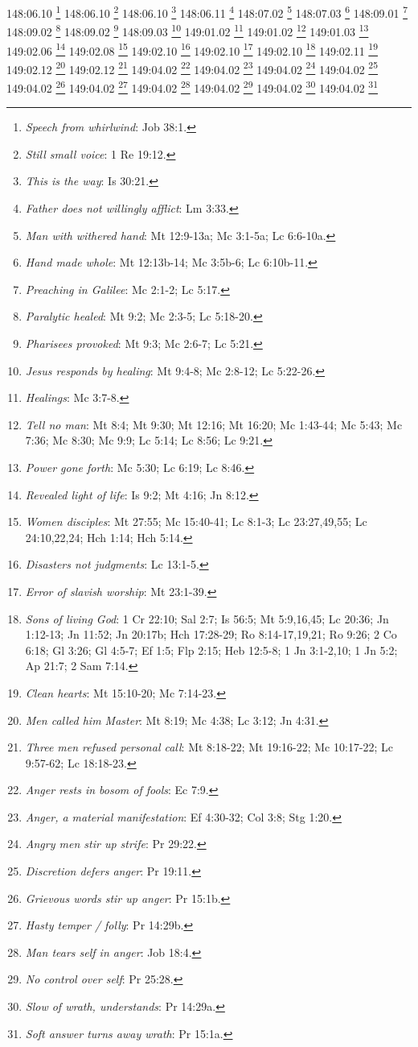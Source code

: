 148:06.10 \footnote{\textit{Speech from whirlwind}: Job 38:1.}
148:06.10 \footnote{\textit{Still small voice}: 1 Re 19:12.}
148:06.10 \footnote{\textit{This is the way}: Is 30:21.}
148:06.11 \footnote{\textit{Father does not willingly afflict}: Lm 3:33.}
148:07.02 \footnote{\textit{Man with withered hand}: Mt 12:9-13a; Mc 3:1-5a; Lc 6:6-10a.}
148:07.03 \footnote{\textit{Hand made whole}: Mt 12:13b-14; Mc 3:5b-6; Lc 6:10b-11.}
148:09.01 \footnote{\textit{Preaching in Galilee}: Mc 2:1-2; Lc 5:17.}
148:09.02 \footnote{\textit{Paralytic healed}: Mt 9:2; Mc 2:3-5; Lc 5:18-20.}
148:09.02 \footnote{\textit{Pharisees provoked}: Mt 9:3; Mc 2:6-7; Lc 5:21.}
148:09.03 \footnote{\textit{Jesus responds by healing}: Mt 9:4-8; Mc 2:8-12; Lc 5:22-26.}
149:01.02 \footnote{\textit{Healings}: Mc 3:7-8.}
149:01.02 \footnote{\textit{Tell no man}: Mt 8:4; Mt 9:30; Mt 12:16; Mt 16:20; Mc 1:43-44; Mc 5:43; Mc 7:36; Mc 8:30; Mc 9:9; Lc 5:14; Lc 8:56; Lc 9:21.}
149:01.03 \footnote{\textit{Power gone forth}: Mc 5:30; Lc 6:19; Lc 8:46.}
149:02.06 \footnote{\textit{Revealed light of life}: Is 9:2; Mt 4:16; Jn 8:12.}
149:02.08 \footnote{\textit{Women disciples}: Mt 27:55; Mc 15:40-41; Lc 8:1-3; Lc 23:27,49,55; Lc 24:10,22,24; Hch 1:14; Hch 5:14.}
149:02.10 \footnote{\textit{Disasters not judgments}: Lc 13:1-5.}
149:02.10 \footnote{\textit{Error of slavish worship}: Mt 23:1-39.}
149:02.10 \footnote{\textit{Sons of living God}: 1 Cr 22:10; Sal 2:7; Is 56:5; Mt 5:9,16,45; Lc 20:36; Jn 1:12-13; Jn 11:52; Jn 20:17b; Hch 17:28-29; Ro 8:14-17,19,21; Ro 9:26; 2 Co 6:18; Gl 3:26; Gl 4:5-7; Ef 1:5; Flp 2:15; Heb 12:5-8; 1 Jn 3:1-2,10; 1 Jn 5:2; Ap 21:7; 2 Sam 7:14.}
149:02.11 \footnote{\textit{Clean hearts}: Mt 15:10-20; Mc 7:14-23.}
149:02.12 \footnote{\textit{Men called him Master}: Mt 8:19; Mc 4:38; Lc 3:12; Jn 4:31.}
149:02.12 \footnote{\textit{Three men refused personal call}: Mt 8:18-22; Mt 19:16-22; Mc 10:17-22; Lc 9:57-62; Lc 18:18-23.}
149:04.02 \footnote{\textit{Anger rests in bosom of fools}: Ec 7:9.}
149:04.02 \footnote{\textit{Anger, a material manifestation}: Ef 4:30-32; Col 3:8; Stg 1:20.}
149:04.02 \footnote{\textit{Angry men stir up strife}: Pr 29:22.}
149:04.02 \footnote{\textit{Discretion defers anger}: Pr 19:11.}
149:04.02 \footnote{\textit{Grievous words stir up anger}: Pr 15:1b.}
149:04.02 \footnote{\textit{Hasty temper / folly}: Pr 14:29b.}
149:04.02 \footnote{\textit{Man tears self in anger}: Job 18:4.}
149:04.02 \footnote{\textit{No control over self}: Pr 25:28.}
149:04.02 \footnote{\textit{Slow of wrath, understands}: Pr 14:29a.}
149:04.02 \footnote{\textit{Soft answer turns away wrath}: Pr 15:1a.}
